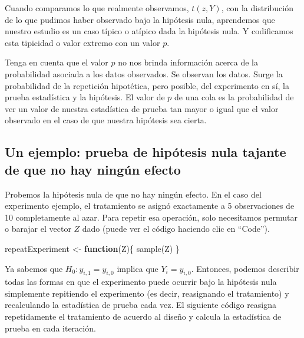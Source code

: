 \documentclass[
]{article}
\newenvironment{Shaded}{\begin{snugshade}}{\end{snugshade}}
\newcommand{\ControlFlowTok}[1]{\textcolor[rgb]{0.13,0.29,0.53}{\textbf{#1}}}
\newcommand{\FunctionTok}[1]{\textcolor[rgb]{0.00,0.00,0.00}{#1}}
\newcommand{\NormalTok}[1]{#1}
\newcommand{\OtherTok}[1]{\textcolor[rgb]{0.56,0.35,0.01}{#1}}
\begin{document}
Cuando comparamos lo que realmente observamos, \(t (z, Y)\), con la distribución de
lo que pudimos haber observado bajo la hipótesis nula, aprendemos que nuestro estudio es un caso típico o atípico dada la hipótesis nula. Y codificamos esta tipicidad o valor extremo con un valor \(p\).

Tenga en cuenta que el valor \(p\) no nos brinda información acerca de la probabilidad asociada a los datos observados. Se observan los datos. Surge la probabilidad de la repetición hipotética, pero posible, del experimento en sí, la prueba estadística y la hipótesis. El valor de \(p\) de una cola es la probabilidad
de ver un valor de nuestra estadística de prueba tan mayor o igual que el valor
observado en el caso de que nuestra hipótesis sea cierta.

\hypertarget{un-ejemplo-prueba-de-hipuxf3tesis-nula-tajante-de-que-no-hay-ninguxfan-efecto}{%
\subsection{Un ejemplo: prueba de hipótesis nula tajante de que no hay ningún efecto}\label{un-ejemplo-prueba-de-hipuxf3tesis-nula-tajante-de-que-no-hay-ninguxfan-efecto}}

Probemos la hipótesis nula de que no hay ningún efecto. En el caso del experimento ejemplo, el tratamiento se asignó exactamente a 5 observaciones de 10 completamente al azar. Para repetir esa operación, solo necesitamos permutar o barajar el vector \(Z\) dado (puede ver el código haciendo clic en ``Code'').

\begin{Shaded}
\begin{Highlighting}[]
\NormalTok{repeatExperiment }\OtherTok{\textless{}{-}} \ControlFlowTok{function}\NormalTok{(Z)\{}
    \FunctionTok{sample}\NormalTok{(Z)}
\NormalTok{\}}
\end{Highlighting}
\end{Shaded}

Ya sabemos que \(H_0: y_{i, 1} = y_{i, 0}\) implica que \(Y_i = y_{i, 0}\). Entonces, podemos describir todas las formas en que el experimento puede ocurrir bajo la hipótesis nula simplemente repitiendo el experimento (es decir, reasignando el tratamiento) y recalculando la estadística de prueba cada vez. El siguiente código reasigna repetidamente el tratamiento de acuerdo al diseño y calcula la estadística de prueba en cada iteración.
\end{document}
